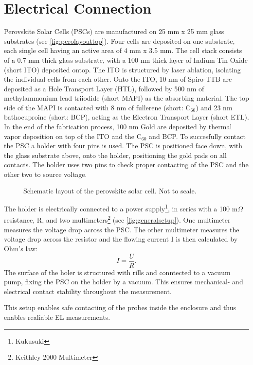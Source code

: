 \section{Electrical Connection}\label{sec:electricalconnection}
Perovskite Solar Cells (PSCs) are manufactured on 25 mm x 25 mm glass substrates (see \autoref{fig:perolayouttop}). Four cells are deposited on one substrate, each single cell having an active area of 4 mm x 3.5 mm. The cell stack consists of a 0.7 mm thick glass substrate, with a 100 nm thick layer of Indium Tin Oxide (short ITO) deposited ontop. The ITO is structured by laser ablation, isolating the individual cells from each other. Onto the ITO, 10 nm of Spiro-TTB are deposited as a Hole Transport Layer (HTL), followed by 500 nm of methylammonium lead triiodide (short MAPI) as the absorbing material. The top side of the MAPI is contacted with 8 nm of fullerene (short: C$_{60}$) and 23 nm bathocuproine (short: BCP), acting as the Electron Transport Layer (short ETL). In the end of the fabrication process, 100 nm Gold are deposited by thermal vapor deposition on top of the ITO and the C$_{60}$ and BCP. To succesfully contact the PSC a holder with four pins is used. The PSC is positioned face down, with the glass substrate above, onto the holder, positioning the gold pads on all contacts. The holder uses two pins to check proper contacting of the PSC and the other two to source voltage.
\begin{figure}
	\centering
	
	\caption{Schematic layout of the perovskite solar cell. Not to scale.}
	\label{fig:perolayouttop}
\end{figure}

The holder is electrically connected to a power supply\footnote{Kukusuki}, in series with a 100 m$\Omega$ resistance, R, and two multimeters\footnote{Keithley 2000 Multimeter} (see \autoref{fig:generalsetup}). One multimeter measures the voltage drop across the PSC. The other multimeter measures the voltage drop across the resistor and the flowing current I is then calculated by Ohm's law:
\begin{equation}
	I = \frac{U}{R}.
\end{equation}
The surface of the holer is structured with rills and conntected to a vacuum pump, fixing the PSC on the holder by a vacuum. This ensures mechanical- and electrical contact stability throughout the measurement.

This setup enables safe contacting of the probes inside the enclosure and thus enables realiable EL measurements.

